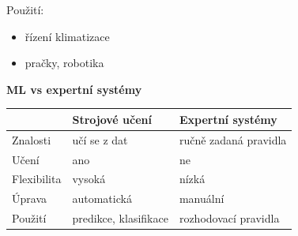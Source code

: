 \documentclass[a4paper,10pt]{article}
\begin{document}
\begin{vysvetlenibox}
Použití:
\begin{itemize}
\item řízení klimatizace
\item pračky, robotika
\end{itemize}

\textbf{ML vs expertní systémy}

\begin{tabularx}{\linewidth}{l X X}
\toprule
 & Strojové učení & Expertní systémy \\
\midrule
Znalosti & učí se z dat & ručně zadaná pravidla \\
Učení & ano & ne \\
Flexibilita & vysoká & nízká \\
Úprava & automatická & manuální \\
Použití & predikce, klasifikace & rozhodovací pravidla \\
\bottomrule
\end{tabularx}

\end{vysvetlenibox}
\end{document}

